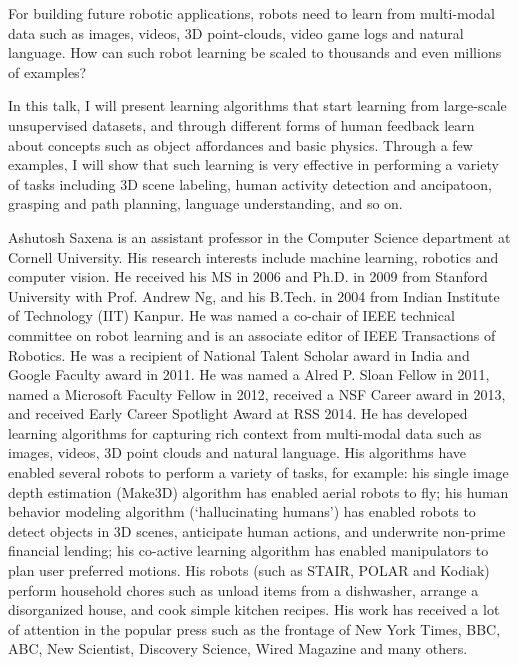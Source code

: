 {
For building future robotic applications, robots need to learn from multi-modal data such as images, videos, 3D point-clouds, video game logs and natural language.  How can such robot learning be scaled to thousands and even millions of examples?   

In this talk, I will present learning algorithms that start learning from large-scale unsupervised datasets, and through different forms of human feedback learn about concepts such as object affordances and basic physics.  Through a few examples, I will show that such learning is very effective in performing a variety of tasks including 3D scene labeling, human activity detection and ancipatoon, grasping and path planning, language understanding, and so on.

}{
Ashutosh Saxena is an assistant professor in the Computer Science department at Cornell University. His research interests include machine learning, robotics and computer vision. He received his MS in 2006 and Ph.D. in 2009 from Stanford University with Prof. Andrew Ng, and his B.Tech. in 2004 from Indian Institute of Technology (IIT) Kanpur.  He was named a co-chair of IEEE technical committee on robot learning and is an associate editor of IEEE Transactions of Robotics. He was a recipient of National Talent Scholar award in India and Google Faculty award in 2011. He was named a Alred P. Sloan Fellow in 2011, named a Microsoft Faculty Fellow in 2012, received a NSF Career award in 2013, and received Early Career Spotlight Award at RSS 2014.
He has developed learning algorithms for capturing rich context from multi-modal data such as images, videos, 3D point clouds and natural language.  His algorithms have enabled several robots to perform a variety of tasks, for example:  his single image depth estimation (Make3D) algorithm has enabled aerial robots to fly; his human behavior modeling algorithm (`hallucinating humans') has enabled robots to detect objects in 3D scenes, anticipate human actions, and underwrite non-prime financial lending; his co-active learning algorithm has enabled manipulators to plan user preferred motions.  His robots (such as STAIR, POLAR and Kodiak) perform household chores such as unload items from a dishwasher, arrange a disorganized house, and cook simple kitchen recipes. His work has received a lot of attention in the popular press such as the frontage of New York Times, BBC, ABC, New Scientist, Discovery Science, Wired Magazine and many others.
}
